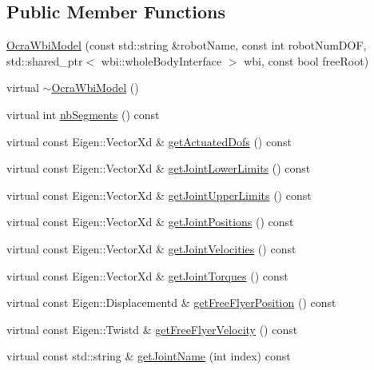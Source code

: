 \subsection*{Public Member Functions}
\begin{DoxyCompactItemize}
\item 
\hyperlink{classocra__icub_1_1OcraWbiModel_a57a4f0f140f56d7ec0a00b31e16f9673}{Ocra\+Wbi\+Model} (const std\+::string \&robot\+Name, const int robot\+Num\+D\+OF, std\+::shared\+\_\+ptr$<$ wbi\+::whole\+Body\+Interface $>$ wbi, const bool free\+Root)
\item 
virtual \hyperlink{classocra__icub_1_1OcraWbiModel_ade110b2e003ccd49d2baa4f56a954e4b}{$\sim$\+Ocra\+Wbi\+Model} ()
\item 
virtual int \hyperlink{classocra__icub_1_1OcraWbiModel_a268f2b5b4dd0de558bfc9d8f9fa23db9}{nb\+Segments} () const
\item 
virtual const Eigen\+::\+Vector\+Xd \& \hyperlink{classocra__icub_1_1OcraWbiModel_acd7bfd155351337be585ae2171f9ddca}{get\+Actuated\+Dofs} () const
\item 
virtual const Eigen\+::\+Vector\+Xd \& \hyperlink{classocra__icub_1_1OcraWbiModel_a16eeeaeb928f3fa1f84273f8081453eb}{get\+Joint\+Lower\+Limits} () const
\item 
virtual const Eigen\+::\+Vector\+Xd \& \hyperlink{classocra__icub_1_1OcraWbiModel_a9752d5a831b935c61853b472fc4ff0ac}{get\+Joint\+Upper\+Limits} () const
\item 
virtual const Eigen\+::\+Vector\+Xd \& \hyperlink{classocra__icub_1_1OcraWbiModel_a87ccd2dd7f30319134cbf6431363b0ed}{get\+Joint\+Positions} () const
\item 
virtual const Eigen\+::\+Vector\+Xd \& \hyperlink{classocra__icub_1_1OcraWbiModel_a1dc6eb6a988b9833c33930e5e828e3c4}{get\+Joint\+Velocities} () const
\item 
virtual const Eigen\+::\+Vector\+Xd \& \hyperlink{classocra__icub_1_1OcraWbiModel_a25f75f03583958fddf4313007b0babdb}{get\+Joint\+Torques} () const
\item 
virtual const Eigen\+::\+Displacementd \& \hyperlink{classocra__icub_1_1OcraWbiModel_a1e48e56afb9ff2904785d5878d1021a9}{get\+Free\+Flyer\+Position} () const
\item 
virtual const Eigen\+::\+Twistd \& \hyperlink{classocra__icub_1_1OcraWbiModel_a6f87ccbf428eed32efb5424ec57eb3c3}{get\+Free\+Flyer\+Velocity} () const
\item 
virtual const std\+::string \& \hyperlink{classocra__icub_1_1OcraWbiModel_a9c5ca5123a2582bb43785db6d61413ea}{get\+Joint\+Name} (int index) const

\end{DoxyCompactItemize}
